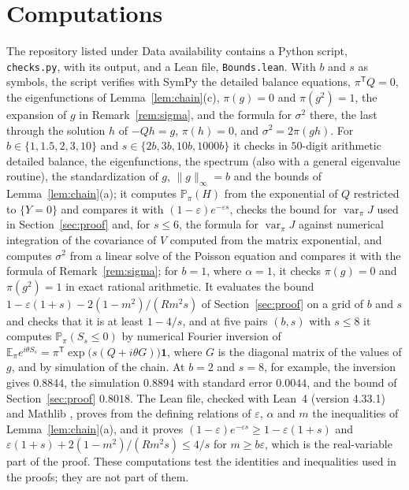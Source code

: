 \documentclass[11pt]{amsart}
\theoremstyle{remark}
\numberwithin{equation}{section}
\newcommand{\Pp}{\mathbb P}
\newcommand{\E}{\mathbb E}
\DeclareMathOperator{\var}{var}
\begin{document}
\section{Computations}\label{sec:checks}

The repository listed under Data availability contains a Python script, \texttt{checks.py}, with its output, and a Lean file, \texttt{Bounds.lean}. With $b$ and $s$ as symbols, the script verifies with SymPy the detailed balance equations, $\pi^{\mathsf T}Q=0$, the eigenfunctions of Lemma~\ref{lem:chain}(c), $\pi(g)=0$ and $\pi(g^2)=1$, the expansion of $g$ in Remark~\ref{rem:sigma}, and the formula for $\sigma^2$ there, the last through the solution $h$ of $-Qh=g$, $\pi(h)=0$, and $\sigma^2=2\pi(gh)$. For $b\in\{1,1.5,2,3,10\}$ and $s\in\{2b,3b,10b,1000b\}$ it checks in $50$-digit arithmetic detailed balance, the eigenfunctions, the spectrum (also with a general eigenvalue routine), the standardization of $g$, $\|g\|_\infty=b$ and the bounds of Lemma~\ref{lem:chain}(a); it computes $\Pp_\pi(H)$ from the exponential of $Q$ restricted to $\{Y=0\}$ and compares it with $(1-\varepsilon)e^{-\varepsilon s}$, checks the bound for $\var_\pi J$ used in Section~\ref{sec:proof} and, for $s\le6$, the formula for $\var_\pi J$ against numerical integration of the covariance of $V$ computed from the matrix exponential, and computes $\sigma^2$ from a linear solve of the Poisson equation and compares it with the formula of Remark~\ref{rem:sigma}; for $b=1$, where $\alpha=1$, it checks $\pi(g)=0$ and $\pi(g^2)=1$ in exact rational arithmetic. It evaluates the bound $1-\varepsilon(1+s)-2(1-m^2)/(Rm^2s)$ of Section~\ref{sec:proof} on a grid of $b$ and $s$ and checks that it is at least $1-4/s$, and at five pairs $(b,s)$ with $s\le8$ it computes $\Pp_\pi(S_s\le0)$ by numerical Fourier inversion of $\E_\pi e^{i\theta S_s}=\pi^{\mathsf T}\exp\bigl(s(Q+i\theta G)\bigr)\mathbf 1$, where $G$ is the diagonal matrix of the values of $g$, and by simulation of the chain. At $b=2$ and $s=8$, for example, the inversion gives $0.8844$, the simulation $0.8894$ with standard error $0.0044$, and the bound of Section~\ref{sec:proof} $0.8018$. The Lean file, checked with Lean~4 \cite{MU21} (version 4.33.1) and Mathlib \cite{Mathlib20}, proves from the defining relations of $\varepsilon$, $\alpha$ and $m$ the inequalities of Lemma~\ref{lem:chain}(a), and it proves $(1-\varepsilon)e^{-\varepsilon s}\ge1-\varepsilon(1+s)$ and $\varepsilon(1+s)+2(1-m^2)/(Rm^2s)\le4/s$ for $m\ge b\varepsilon$, which is the real-variable part of the proof. These computations test the identities and inequalities used in the proofs; they are not part of them.
\end{document}
